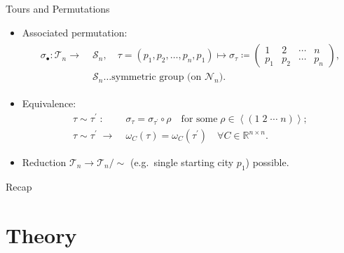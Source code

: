 \documentclass[
  size=8pt,
  style=klope,
  paper=screen,
  pauseslide,
  nopagebreaks,
  hlsections,
  fleqn
]{powerdot}
\def\eqitspace{\vspace{-5mm}}
\begin{document}
\begin{slide}{Tours and Permutations}
\begin{itemize}
  \item
  Associated permutation:
  \begin{align}
  \begin{split}
    \sigma_\bullet :
    \mathcal{T}_n \to \; & \mathcal{S}_n, \quad
    \tau = \left(p_1, p_2, \ldots, p_n, p_1 \right)
    \mapsto
  \sigma_\tau \coloneqq
  \begin{pmatrix}
    1 & 2 & \cdots & n \\
    p_1 & p_2 & \cdots &  p_n
  \end{pmatrix},
  \\
  & \mathcal{S}_n \ldots \text{symmetric group (on }\mathcal{N}_n \text{)}.
  \end{split}
  \end{align}
\eqitspace%
\item
  Equivalence:
  \begin{align}
    \tau \sim \tau^\prime
    \;:\;
    &
    \sigma_\tau = \sigma_{\tau^\prime} \circ \rho
    \quad \text{for some}\; \rho \in \left<\left(1 \; 2 \; \cdots \; n \right)\right>;
    \\
    \tau \sim \tau^\prime
    \;\rightarrow\;
    &
    \omega_C\left(\tau\right) = \omega_C\left(\tau^\prime\right)
    \quad \forall C \in \mathbb{R}^{n \times n}.
  \end{align}
  \eqitspace%
  \item
  Reduction $\mathcal{T}_n \to \mathcal{T}_n/{\sim}$ (e.g.\ single starting city $p_1$) possible.
\end{itemize}
\end{slide}

\begin{slide}[toc=,bm=]{Recap}
\tableofcontents[content=currentsection,type=1]
\end{slide}

\section[template=wideslide]{Theory}
\end{document}
